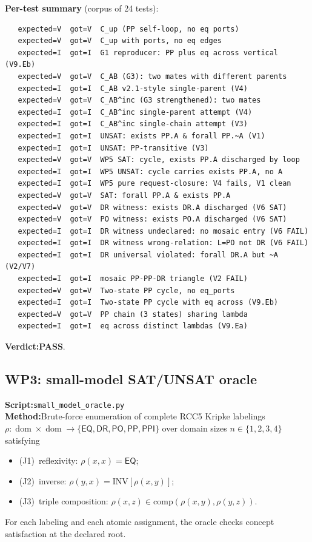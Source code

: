 \documentclass[11pt]{article}
\newcommand{\EQ}{\mathsf{EQ}}
\newcommand{\PP}{\mathsf{PP}}
\newcommand{\PPI}{\mathsf{PPI}}
\newcommand{\PO}{\mathsf{PO}}
\newcommand{\DR}{\mathsf{DR}}
\newcommand{\dom}{\operatorname{dom}}
\newcommand{\PASS}{\textcolor{black!70!green}{\textbf{PASS}}}
\begin{document}
\textbf{Per-test summary} (corpus of 24 tests):
\begin{lstlisting}
   expected=V  got=V  C_up (PP self-loop, no eq ports)
   expected=V  got=V  C_up with ports, no eq edges
   expected=I  got=I  G1 reproducer: PP plus eq across vertical (V9.Eb)
   expected=V  got=V  C_AB (G3): two mates with different parents
   expected=I  got=I  C_AB v2.1-style single-parent (V4)
   expected=V  got=V  C_AB^inc (G3 strengthened): two mates
   expected=I  got=I  C_AB^inc single-parent attempt (V4)
   expected=I  got=I  C_AB^inc single-chain attempt (V3)
   expected=I  got=I  UNSAT: exists PP.A & forall PP.~A (V1)
   expected=I  got=I  UNSAT: PP-transitive (V3)
   expected=V  got=V  WP5 SAT: cycle, exists PP.A discharged by loop
   expected=I  got=I  WP5 UNSAT: cycle carries exists PP.A, no A
   expected=I  got=I  WP5 pure request-closure: V4 fails, V1 clean
   expected=V  got=V  SAT: forall PP.A & exists PP.A
   expected=V  got=V  DR witness: exists DR.A discharged (V6 SAT)
   expected=V  got=V  PO witness: exists PO.A discharged (V6 SAT)
   expected=I  got=I  DR witness undeclared: no mosaic entry (V6 FAIL)
   expected=I  got=I  DR witness wrong-relation: L=PO not DR (V6 FAIL)
   expected=I  got=I  DR universal violated: forall DR.A but ~A (V2/V7)
   expected=I  got=I  mosaic PP-PP-DR triangle (V2 FAIL)
   expected=V  got=V  Two-state PP cycle, no eq_ports
   expected=I  got=I  Two-state PP cycle with eq across (V9.Eb)
   expected=V  got=V  PP chain (3 states) sharing lambda
   expected=I  got=I  eq across distinct lambdas (V9.Ea)
\end{lstlisting}

\textbf{Verdict:}\quad \PASS{}.

\subsection{WP3: small-model SAT/UNSAT oracle}

\textbf{Script:}\quad \texttt{small\_model\_oracle.py}\\
\textbf{Method:}\quad Brute-force enumeration of complete RCC5
Kripke labelings \(\rho : \dom \times \dom \to \{\EQ,\DR,\PO,\PP,\PPI\}\)
over domain sizes \(n \in \{1,2,3,4\}\) satisfying
\begin{itemize}[leftmargin=2em]
  \item (J1)~reflexivity: \(\rho(x,x) = \EQ\);
  \item (J2)~inverse: \(\rho(y,x) = \mathrm{INV}[\rho(x,y)]\);
  \item (J3)~triple composition:
    \(\rho(x,z) \in \mathrm{comp}(\rho(x,y), \rho(y,z))\).
\end{itemize}
For each labeling and each atomic assignment, the oracle checks
concept satisfaction at the declared root.
\end{document}
